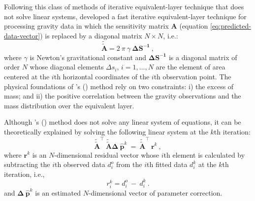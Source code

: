 Following this class of methods of iterative equivalent-layer technique that does not solve linear systems, \cite{siqueira-etal2017} developed a fast iterative equivalent-layer technique for processing gravity data
in which the sensitivity matrix $\mathbf{A}$ (equation \ref{eq:predicted-data-vector}) 
is replaced by a diagonal matrix $ N \times N$, i.e.:
\begin{equation}
	\mathbf{\tilde{\tilde{A}}} = 2\: \pi \: \gamma \: \mathbf{{\Delta S}^{-1}}  \: ,
	\label{eq:A_siqueira}
\end{equation}
where $\gamma$ is Newton's gravitational constant  and 
$\mathbf{{\Delta S}^{-1}}$ is a diagonal matrix of order $N$ whose diagonal elements ${\Delta s}_{i}$, $i = 1, ..., N$  are the element of area centered at the $i$th horizontal coordinates of the $i$th observation point.
The physical foundations of \citeauthor{siqueira-etal2017}'s (\citeyear{siqueira-etal2017}) method  
rely on two constraints: i) the excess of mass; and ii)  the positive correlation between the gravity observations and the mass distribution over the equivalent layer.

Although \citeauthor{siqueira-etal2017}'s (\citeyear{siqueira-etal2017}) method  does not solve any 
linear system of equations, it can be theoretically explained by solving the following linear system
at the $k$th iteration:
\begin{equation}
	\mathbf{\tilde{\tilde{A}}}^{\top} \: \mathbf{\tilde{\tilde{A}}} {{\mathbf{\Delta \: \hat{p}}} }^{k}
	 \: = \:  \mathbf{\tilde{\tilde{A}}}^{\top} \: \mathbf{r}^{k} \: ,
	\label{eq:linear_system_siqueira}
\end{equation}
where $ \mathbf{r}^{k} $ is an $N$-dimensional residual vector whose $i$th element is calculated by subtracting the  $i$th observed data $d^{o}_{i}$ from the  $i$th fitted data $d^{k}_{i}$ at the $k$th iteration, i.e.,
\begin{equation}
	r^{k}_{i} =  d^{o}_{i} \: - \: d^{k}_{i} \:.
	\label{eq:r_siqueira}
\end{equation}
and ${{\mathbf{\Delta \: \hat{p}}} }^{k}$ is an estimated $N$-dimensional vector of parameter correction.

